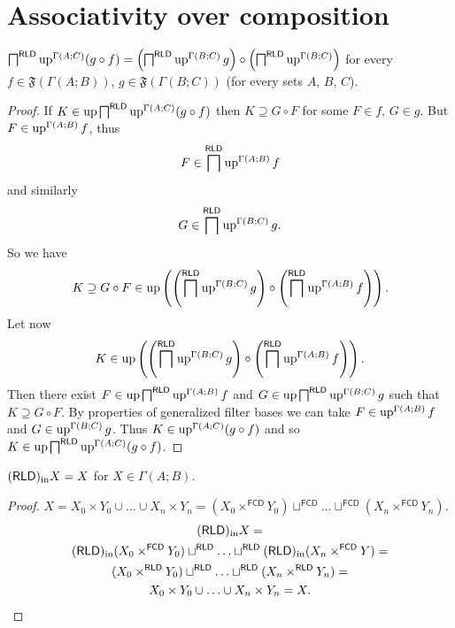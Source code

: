 \section{Associativity over composition}
\begin{lem}
\label{uparr-gamma-comp}$\bigsqcap^{\mathsf{RLD}}\operatorname{up}^{\Gamma(A;C)}(g\circ f)=\left(\bigsqcap^{\mathsf{RLD}}\operatorname{up}^{\Gamma(B;C)}g\right)\circ\left(\bigsqcap^{\mathsf{RLD}}\operatorname{up}^{\Gamma(B;C)}\right)$
for every $f\in\mathfrak{F}(\Gamma(A;B))$, $g\in\mathfrak{F}(\Gamma(B;C))$
(for every sets $A$, $B$, $C$).\end{lem}
\begin{proof}
If $K\in\operatorname{up}\bigsqcap^{\mathsf{RLD}}\operatorname{up}^{\Gamma(A;C)}(g\circ f)$ then
$K\supseteq G\circ F$ for some $F\in f$, $G\in g$. But $F\in\operatorname{up}^{\Gamma(A;B)}f$,
thus 
\[
F\in\bigsqcap^{\mathsf{RLD}}\operatorname{up}^{\Gamma(A;B)}f
\]
and similarly 
\[
G\in\bigsqcap^{\mathsf{RLD}}\operatorname{up}^{\Gamma(B;C)}g.
\]
So we have 
\[
K\supseteq G\circ F\in\operatorname{up}\left(\left(\bigsqcap^{\mathsf{RLD}}\operatorname{up}^{\Gamma(B;C)}g\right)\circ\left(\bigsqcap^{\mathsf{RLD}}\operatorname{up}^{\Gamma(A;B)}f\right)\right).
\]
Let now 
\[
K\in\operatorname{up}\left(\left(\bigsqcap^{\mathsf{RLD}}\operatorname{up}^{\Gamma(B;C)}g\right)\circ\left(\bigsqcap^{\mathsf{RLD}}\operatorname{up}^{\Gamma(A;B)}f\right)\right).
\]
Then there exist $F\in\operatorname{up}\bigsqcap^{\mathsf{RLD}}\operatorname{up}^{\Gamma(A;B)}f$
and $G\in\operatorname{up}\bigsqcap^{\mathsf{RLD}}\operatorname{up}^{\Gamma(B;C)}g$ such that
$K\supseteq G\circ F$. By properties of generalized filter bases
we can take $F\in\operatorname{up}^{\Gamma(A;B)}f$ and $G\in\operatorname{up}^{\Gamma(B;C)}g$.
Thus $K\in\operatorname{up}^{\Gamma(A;C)}(g\circ f)$ and so $K\in\operatorname{up}\bigsqcap^{\mathsf{RLD}}\operatorname{up}^{\Gamma(A;C)}(g\circ f)$.\end{proof}
\begin{lem}
$(\mathsf{RLD})_{\mathrm{in}} X=X$ for $X\in\Gamma(A;B)$.\end{lem}
\begin{proof}
$X=X_{0}\times Y_{0}\cup\ldots\cup X_{n}\times Y_{n}=(X_{0}\times^{\mathsf{FCD}}Y_{0})\sqcup^{\mathsf{FCD}}\ldots\sqcup^{\mathsf{FCD}}(X_{n}\times^{\mathsf{FCD}}Y_{n})$.
\begin{multline*}
(\mathsf{RLD})_{\mathrm{in}} X=\\
(\mathsf{RLD})_{\mathrm{in}}(X_{0}\times^{\mathsf{FCD}}Y_{0})\sqcup^{\mathsf{RLD}}\ldots\sqcup^{\mathsf{RLD}}(\mathsf{RLD})_{\mathrm{in}}(X_{n}\times^{\mathsf{FCD}}Y)=\\
(X_{0}\times^{\mathsf{RLD}}Y_{0})\sqcup^{\mathsf{RLD}}\ldots\sqcup^{\mathsf{RLD}}(X_{n}\times^{\mathsf{RLD}}Y_{n})=\\
X_{0}\times Y_{0}\cup\ldots\cup X_{n}\times Y_{n}=X.
\end{multline*}
\end{proof}
